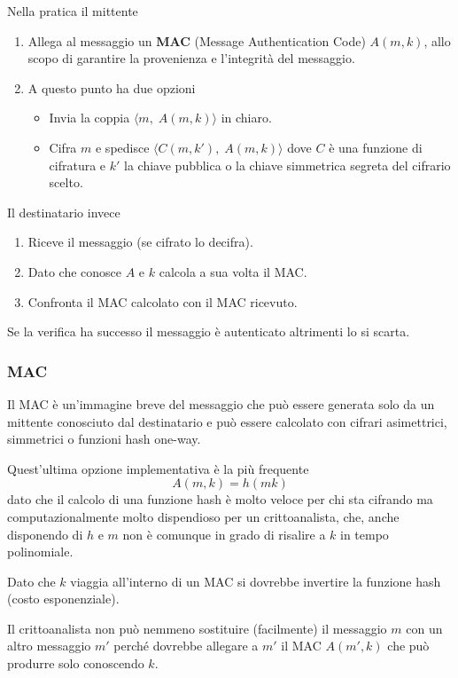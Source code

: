 Nella pratica il mittente
\begin{enumerate}
	\item Allega al messaggio un \textbf{MAC} (Message Authentication Code) $A(m, k)$, allo scopo di garantire la
	      provenienza e l'integrit\`a del messaggio.
	\item A questo punto ha due opzioni
	      \begin{itemize}
		      \item Invia la coppia $\langle m,\; A(m, k) \rangle$ in chiaro.
		      \item Cifra $m$ e spedisce $\langle C(m, k'),\; A(m, k) \rangle$ dove $C$ \`e una funzione di cifratura
		            e $k'$ la chiave pubblica o la chiave simmetrica segreta del cifrario scelto.
	      \end{itemize}
\end{enumerate}

Il destinatario invece
\begin{enumerate}
	\item Riceve il messaggio (se cifrato lo decifra).
	\item Dato che conosce $A$ e $k$ calcola a sua volta il MAC.
	\item Confronta il MAC calcolato con il MAC ricevuto.
\end{enumerate}
Se la verifica ha successo il messaggio \`e autenticato altrimenti lo si scarta.

\subsubsection{MAC}
Il MAC \`e un'immagine breve del messaggio che pu\`o essere generata solo da un mittente conosciuto dal destinatario
e pu\`o essere calcolato con cifrari asimettrici, simmetrici o funzioni hash one-way.

Quest'ultima opzione implementativa \`e la pi\`u frequente
\[ A(m, k) = h(m k) \]
dato che il calcolo di una funzione hash \`e molto veloce per chi sta cifrando ma computazionalmente molto dispendioso
per un crittoanalista, che, anche disponendo di $h$ e $m$ non \`e comunque in grado di risalire a $k$ in tempo
polinomiale.

Dato che $k$ viaggia all'interno di un MAC si dovrebbe invertire la funzione hash (costo esponenziale).

Il crittoanalista non pu\`o nemmeno sostituire (facilmente) il messaggio $m$ con un altro messaggio $m'$ perch\'e
dovrebbe allegare a $m'$ il MAC $A(m', k)$ che pu\`o produrre solo conoscendo $k$.

